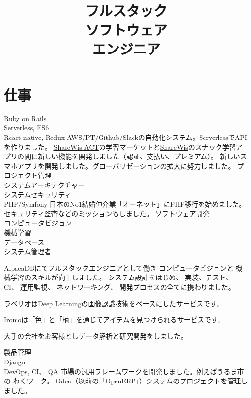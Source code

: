 \documentclass[a4paper,11pt]{cv4tw}%
\title{\\ フルスタック\\ソフトウェア\\エンジニア}
\begin{document}
\section{仕事}
{Ruby on Rails\\Serverless, ES6\\React native, Redux}
    {
    AWS/PT/Github/Slackの自動化システム。ServerlessでAPIを作りました。
    \underline{\href{https://share-wis.com/pro_courses}{ShareWis ACT}}の学習マーケットと\underline{\href{https://share-wis.com/snack_courses}{ShareWis}}のスナック学習アプリの間に新しい機能を開発しました（認証、支払い、プレミアム）。
    新しいスマホアプリを開発しました。グローバリゼーションの拡大に努力しました。
}
{プロジェクト管理\\システムアーキテクチャー\\システムセキュリティ\\PHP/Symfony}
{
    日本のNo1結婚仲介業「オーネット」にPHP移行を始めました。セキュリティ監査などのミッションもしました。
}
{ソフトウェア開発\\コンピュータビジョン\\ 機械学習\\データベース\\システム管理者}
    {
        AlpacaDBにてフルスタックエンジニアとして働き コンピュータビジョンと
       機械学習のスキルが向上しました。
       システム設計をはじめ、 実装、テスト、 CI、 運用監視、 ネットワーキング、
       開発プロセスの全てに携わりました。
	\begin{missions}
        \item \underline{\href{http://www.labell.io/}{ラベリオ}}はDeep
            Learningの画像認識技術をベースにしたサービスです。
        \item \underline{\href{http://iromo.jp}{Iromo}}は「色」と「柄」を通じてアイテムを見つけられるサービスです。
        \item 大手の会社をお客様としデータ解析と研究開発をしました。
	\end{missions}
}
{製品管理\\Django\\DevOps, CI、 QA}
	{ 市場の汎用フレームワークを開発しました。例えばうるま市の
            \underline{\href{https://uruma-work.com}{わくワーク}}。
        Odoo（以前の「OpenERP」）システムのプロジェクトを管理しました。
}
\end{document}
